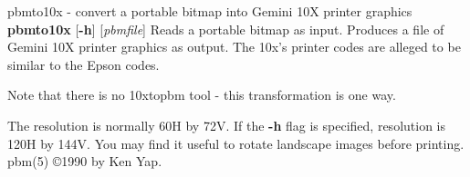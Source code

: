 \newpage
%

pbmto10x - convert a portable bitmap into Gemini 10X printer graphics
{\bf pbmto10x}
{\rm [}{\bf -h}{\rm ]}
{\rm [}{\it pbmfile}{\rm ]}
Reads a portable bitmap as input.
Produces a file of Gemini 10X printer graphics as output.
The 10x's printer codes are alleged to be similar to the Epson codes.
\par
Note that there is no 10xtopbm tool - this transformation is one way.
\par
The resolution is normally 60H by 72V.
If the
{\bf -h}
flag is specified, resolution is 120H by 144V.
You may find it useful to rotate landscape images before printing.
pbm(5)
\copyright 1990 by Ken Yap.
%
 
%

\newpage
%


